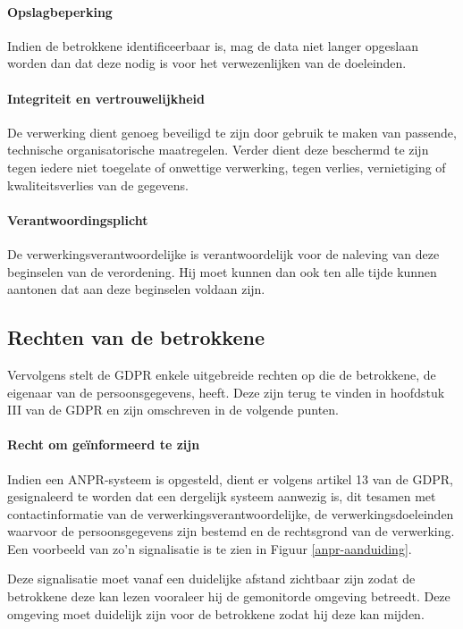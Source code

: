 \paragraph{Opslagbeperking}
Indien de betrokkene identificeerbaar is, mag de data niet langer opgeslaan worden dan dat deze nodig is voor het verwezenlijken van de doeleinden.

\paragraph{Integriteit en vertrouwelijkheid}
De verwerking dient genoeg beveiligd te zijn door gebruik te maken van passende, technische organisatorische maatregelen. Verder dient deze beschermd te zijn tegen iedere niet toegelate of onwettige verwerking, tegen verlies, vernietiging of kwaliteitsverlies van de gegevens.

\paragraph{Verantwoordingsplicht}
De verwerkingsverantwoordelijke is verantwoordelijk voor de naleving van deze beginselen van de verordening. Hij moet kunnen dan ook ten alle tijde kunnen aantonen dat aan deze beginselen voldaan zijn.


\subsection{Rechten van de betrokkene}
\label{rechten-betrokkene}
Vervolgens stelt de GDPR enkele uitgebreide rechten op die de betrokkene, de eigenaar van de persoonsgegevens, heeft. Deze zijn terug te vinden in hoofdstuk III van de GDPR en zijn omschreven in de volgende punten.

\paragraph{Recht om geïnformeerd te zijn}
Indien een ANPR-systeem is opgesteld, dient er volgens artikel 13 van de GDPR, gesignaleerd te worden dat een dergelijk systeem aanwezig is, dit tesamen met contactinformatie van de verwerkingsverantwoordelijke, de verwerkingsdoeleinden waarvoor de persoonsgegevens zijn bestemd en de rechtsgrond van de verwerking. Een voorbeeld van zo'n signalisatie is te zien in Figuur \ref{anpr-aanduiding}.

Deze signalisatie moet vanaf een duidelijke afstand zichtbaar zijn zodat de betrokkene deze kan lezen vooraleer hij de gemonitorde omgeving betreedt. Deze omgeving moet duidelijk zijn voor de betrokkene zodat hij deze kan mijden.

